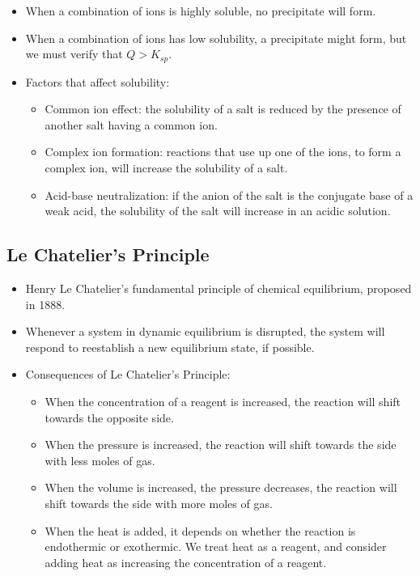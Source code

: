 \documentclass{article}
\begin{document}
\begin{itemize}
    \item When a combination of ions is highly soluble, no precipitate will form.
    \item When a combination of ions has low solubility, a precipitate might form, but we must verify that $Q>K_{sp}$.
    \item Factors that affect solubility:
    \begin{itemize}
        \item Common ion effect: the solubility of a salt is reduced by the presence of another salt having a common ion.
        \item Complex ion formation: reactions that use up one of the ions, to form a complex ion, will increase the solubility of a salt.
        \item Acid-base neutralization: if the anion of the salt is the conjugate base of a weak acid, the solubility of the salt will increase in an acidic solution.
    \end{itemize}
\end{itemize}

\subsection{Le Chatelier's Principle}

\begin{itemize}
    \item Henry Le Chatelier's fundamental principle of chemical equilibrium, proposed in 1888.
    \item Whenever a system in dynamic equilibrium is disrupted, the system will respond to reestablish a new equilibrium state, if possible.
    \item Consequences of Le Chatelier's Principle:
    \begin{itemize}
        \item When the concentration of a reagent is increased, the reaction will shift towards the opposite side.
        \item When the pressure is increased, the reaction will shift towards the side with less moles of gas.
        \item When the volume is increased, the pressure decreases, the reaction will shift towards the side with more moles of gas. 
        \item When the heat is added, it depends on whether the reaction is endothermic or exothermic. We treat heat as a reagent, and consider adding heat as increasing the concentration of a reagent. 
    \end{itemize}
\end{itemize}
\end{document}

